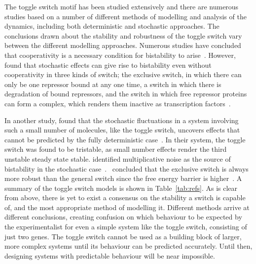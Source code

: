 The toggle switch motif has been studied extensively and there are numerous studies based on a number of different methods of modelling and analysis of the dynamics, including both deterministic and stochastic approaches. The conclusions drawn about the stability and robustness of the toggle switch vary between the different modelling approaches. Numerous studies have concluded that cooperativity is a necessary condition for bistability to arise~\autocite{Gardner:2000vha, Walczak:2005ds, Warren:2004baa, Warren:2005kea, Cherry:2000wi}. However, ~\textcite{Lipshtat:2006wb} found that stochastic effects can give rise to bistability even without cooperativity in three kinds of switch; the exclusive switch, in which there can only be one repressor bound at any one time, a switch in which there is degradation of bound repressors, and the switch in which free repressor proteins can form a complex, which renders them inactive as transcription factors~\autocite{Lipshtat:2006wb}. 

In another study, \textcite{Ma:2012dt} found that the stochastic fluctuations in a system involving such a small number of molecules, like the toggle switch, uncovers effects that cannot be predicted by the fully deterministic case~\autocite{Ma:2012dt}. In their system, the toggle switch was found to be tristable, as small number effects render the third unstable steady state stable. \textcite{Biancalani:2015vya} identified multiplicative noise as the source of bistability in the stochastic case~\autocite{Biancalani:2015vya}.~\textcite{Warren:2005kea} concluded that the exclusive switch is always more robust than the general switch since the free energy barrier is higher~\autocite{Warren:2005kea}. A summary of the toggle switch models is shown in Table~\ref{tab:refs}. As is clear from above, there is yet to exist a consensus on the stability a switch is capable of, and the most appropriate method of modelling it. Different methods arrive at different conclusions, creating confusion on which behaviour to be expected by the experimentalist for even a simple system like the toggle switch, consisting of just two genes. The toggle switch cannot be used as a building block of larger, more complex systems until its behaviour can be predicted accurately. Until then, designing systems with predictable behaviour will be near impossible.


